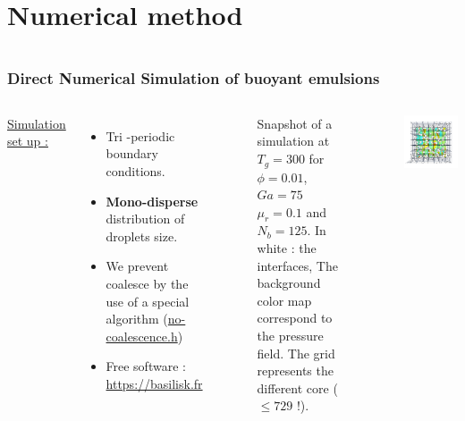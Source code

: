 \documentclass{sintefbeamer}
\begin{document}
\section{Numerical method}
\section*{}
\begin{frame}
  \frametitle{Direct Numerical Simulation of buoyant emulsions}
  \begin{columns}
  \underline{Simulation set up :} 
  \begin{itemize}
    \item Tri -periodic boundary conditions. 
    \item \textbf{Mono-disperse} distribution of droplets size.
    \item We prevent coalesce by the use of a special algorithm 
    (\href{http://basilisk.fr/sandbox/fintzin/Rising-Suspension/no-coalescence.h}{no-coalescence.h})
    \item Free software : \url{https://basilisk.fr}
  \end{itemize}
  
  \begin{figure}
    \caption{Snapshot of a simulation at $T_g = 300$ for $\phi = 0.01$, $Ga = 75$ $\mu_r = 0.1$ and $N_b = 125$. In white : the interfaces, The background color map correspond to the pressure field. The grid represents the different core ($\le 729$ !).
    }
  \end{figure}
  \centering
  \includegraphics[width =  1.1\textwidth]{image/PHI_01_Ga_75.png}
  \end{columns}
  \end{frame}
  
\end{document}
